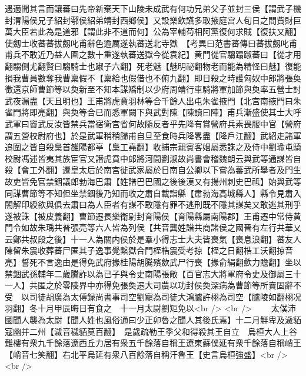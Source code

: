遇適聞其言而讓蕃曰先帝新棄天下山陵未成武有何功兄弟父子並封三侯【謂武子機封渭陽侯兄子紹封鄠侯紹弟靖封西鄉侯】又設樂飲讌多取掖庭宫人旬日之間貲財巨萬大臣若此為是道邪【謂此非不道而何】公為宰輔苟相阿黨復何求賊【復扶又翻】使劔士收蕃蕃拔劔叱甫辭色逾厲遂執蕃送北寺獄　【考異曰范書蕃傳曰蕃拔劔叱甫甫兵不敢近乃益人圍之數十重遂執蕃送獄今從袁紀】黄門從官騶蹋踧蕃曰【從才用翻騶側尤翻賢曰騶騎士也踧子六翻】死老魅【魅明祕翻物老而能為精怪曰魅】復能損我曹員數奪我曹稟假不【稟給也假借也不俯九翻】即日殺之時護匈奴中郎將張奐徵還京師曹節等以奐新至不知本謀矯制以少府周靖行車騎將軍加節與奐率五營士討武夜漏盡【天且明也】王甫將虎賁羽林等合千餘人出屯朱雀掖門【北宫南掖門曰朱雀門將即亮翻】與奐等合已而悉軍闕下與武對陳【陳讀曰陣】甫兵漸盛使其士大呼武軍曰竇武反汝皆禁兵當宿衛宫省何故隨反者乎先降有賞營府兵素畏服中官【營府謂五營校尉府也】於是武軍稍稍歸甫自旦至食時兵降畧盡【降戶江翻】武紹走諸軍追圍之皆自殺梟首雒陽都亭【梟工堯翻】收捕宗親賓客姻屬悉誅之及侍中劉瑜屯騎校尉馮述皆夷其族宦官又譖虎賁中郎將河間劉淑故尚書會稽魏朗云與武等通謀皆自殺【會工外翻】遷皇太后於南宫徙武家屬於日南自公卿以下嘗為蕃武所舉者及門生故吏皆免官禁錮議郎勃海巴肅【姓譜巴巴國之後後漢又有揚州刺史巴祗】始與武等同謀曹節等不知但坐禁錮後乃知而收之肅自載詣縣【肅勃海高城縣人】縣令見肅入閤解印綬欲與俱去肅曰為人臣者有謀不敢隱有罪不逃刑既不隱其謀矣又敢逃其刑乎遂被誅【被皮義翻】曹節遷長樂衛尉封育陽侯【育陽縣屬南陽郡】王甫遷中常侍黄門令如故朱瑀共普張亮等六人皆為列侯【共音龔姓譜共商諸侯之國晉有左行共華乂云鄭共叔段之後】十一人為關内侯於是羣小得志士大夫皆喪氣【喪息浪翻】蕃友人陳留朱震收葬蕃尸匿其子逸事覺繫獄合門桎梏震受考掠【桎之日翻梏工沃翻掠音亮】誓死不言逸由是得免武府掾桂陽胡騰殯歛武尸行喪【掾俞絹翻歛力贍翻】坐以禁錮武孫輔年二歲騰詐以為已子與令史南陽張敞【百官志大將軍府令史及御屬三十一人】共匿之於零陵界中亦得免張奐遷大司農以功封侯奐深病為曹節等所賣固辭不受　以司徒胡廣為太傅録尚書事司空劉寵為司徒大鴻臚許栩為司空【臚陵如翻栩况羽翻】冬十月甲辰晦日有食之　十一月太尉劉矩免以<br />
<br />
　　太僕沛國聞人襲為太尉【聞人姓也風俗通曰少正卯魯之聞人其後氏焉】十二月鮮卑及濊貊寇幽并二州【濊音穢貊莫百翻】　是歲疏勒王季父和得殺其王自立　烏桓大人上谷難樓有衆九千餘落遼西丘力居有衆五千餘落自稱王遼東蘇僕延有衆千餘落自稱峭王【峭音七笑翻】右北平烏延有衆八百餘落自稱汗魯王【史言烏桓強盛】<br />
<br />
